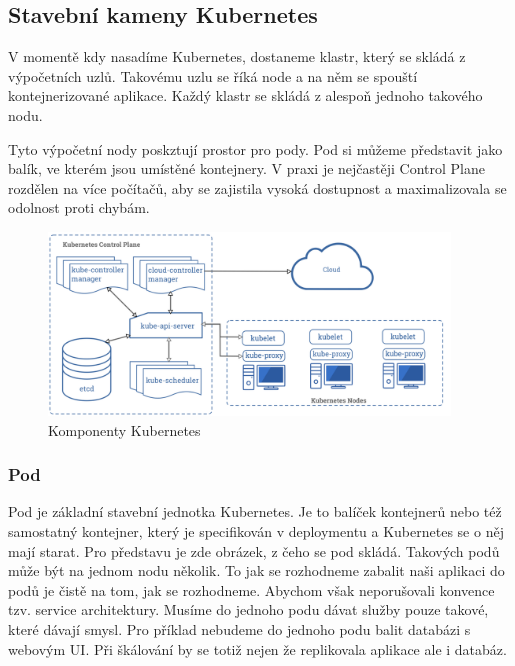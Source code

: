 \subsection{Stavební kameny Kubernetes}

V momentě kdy nasadíme Kubernetes, dostaneme klastr, který se skládá z výpočetních uzlů. Takovému uzlu se říká node a na něm se spouští kontejnerizované aplikace. Každý klastr se skládá z alespoň jednoho takového nodu. 

Tyto výpočetní nody poskztují prostor pro pody. Pod si můžeme představit jako balík, ve kterém jsou umístěné kontejnery. V praxi je nejčastěji Control Plane rozdělen na více počítačů, aby se zajistila vysoká dostupnost a maximalizovala se odolnost proti chybám. 

\begin{figure}[!ht]
	\centering
 	\includegraphics[width=0.95\textwidth, angle=0]{kubernetes-architecture.png}
 	\caption[Komponenty Kubernetes]{Komponenty Kubernetes}\label{fig:architecture}
\end{figure}

\subsubsection{Pod}
Pod je základní stavební jednotka Kubernetes. Je to balíček kontejnerů nebo též samostatný kontejner, který je specifikován v deploymentu a Kubernetes se o něj mají starat. Pro představu je zde obrázek, z čeho se pod skládá. Takových podů může být na jednom nodu několik. To jak se rozhodneme zabalit naši aplikaci do podů je čistě na tom, jak se rozhodneme. Abychom však neporušovali konvence tzv. service architektury. Musíme do jednoho podu dávat služby pouze takové, které dávají smysl. Pro příklad nebudeme do jednoho podu balit databázi s webovým UI. Při škálování by se totiž nejen že replikovala aplikace ale i databáz.  

